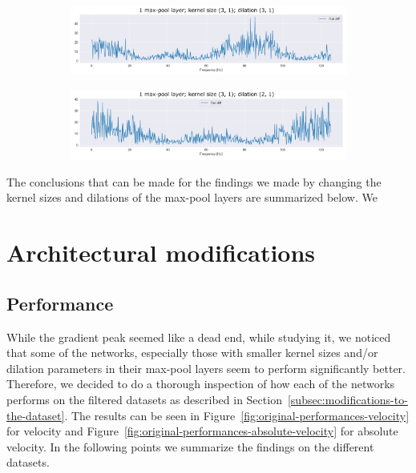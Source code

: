 \begin{figure}
\centering
\begin{subfigure}[b]{\textwidth}
   \includegraphics[width=1\linewidth]{img/ch4/absVel-maxpool-k3-d3}
   \caption{}
   \label{fig:Ng1} 
\end{subfigure}

\begin{subfigure}[b]{\textwidth}
   \includegraphics[width=1\linewidth]{img/ch4/absVel-maxpool-k3-d2}
   \caption{}
   \label{fig:Ng2}
\end{subfigure}

\caption[]{}
\end{figure}

The conclusions that can be made for the findings we made by changing the kernel sizes and dilations of the max-pool layers are summarized below.
We
\section{Architectural modifications}\label{sec:architectural-modifications}
\subsection{Performance}\label{subsec:performance}
While the gradient peak seemed like a dead end, while studying it, we noticed that some of the networks, especially those with smaller kernel sizes and/or dilation parameters in their max-pool layers seem to perform significantly better.
Therefore, we decided to do a thorough inspection of how each of the networks performs on the filtered datasets as described in Section~\ref{subsec:modifications-to-the-dataset}.
The results can be seen in Figure~\ref{fig:original-performances-velocity} for velocity and Figure~\ref{fig:original-performances-absolute-velocity} for absolute velocity.
In the following points we summarize the findings on the different datasets.


